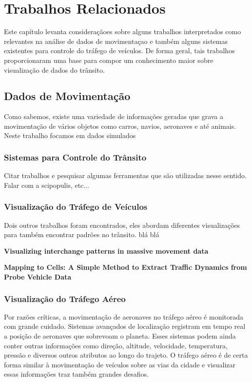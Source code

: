 \chapter{Trabalhos Relacionados}
\label{cap:trabalhos-relacionados}

Este capítulo levanta consideraçãoes sobre alguns trabalhos interpretados como
relevantes na análise de dados de movimentaçao e também alguns sistemas existentes
para controle do tráfego de veículos. De forma geral, tais trabalhos proporcionaram uma base
para compor um conhecimento maior sobre visualização de dados do trânsito.

\section{Dados de Movimentação}
Como sabemos, existe uma variedade de informações geradas que grava a movimentação
de vários objetos como carros, navios, aeronaves e até animais. Neste trabalho
focamos em dados simulados 

\subsection{Sistemas para Controle do Trânsito}

Citar trabalhos e pesquisar algumas ferramentas que são utilizadas nesse sentido.
Falar com a scipopulis, etc... 

\subsection{Visualização do Tráfego de Veículos}

Dois outros trabalhos foram encontrados, eles abordam diferentes visualizações
para também encontrar padrões no trânsito. blá blá

\textbf{Visualizing interchange patterns in massive movement data}

\textbf{Mapping to Cells: A Simple Method to Extract Traffic Dynamics from Probe Vehicle Data}

\subsection{Visualização do Tráfego Aéreo}

  Por razões críticas, a movimentação de aeronaves no tráfego aéreo é monitorada
  com grande cuidado. Sistemas avançados de localização registram em tempo real
  a posição de aeronaves que sobrevoam o planeta. Esses sistemas podem ainda
  conter outras informações como direção, altitude, velocidade, temperatura, pressão
  e diversos outros atributos ao longo do trajeto. O tráfego aéreo é de certa
  forma similar à movimentação de veículos sobre as vias da cidade e visualizar
  essas informações traz também grandes desafios.

